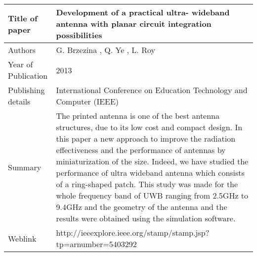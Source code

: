 \documentclass{article}
\begin{document}
\begin{table}
  \centering
	\begin{tabular}{ |l|p{11cm}| }
			\hline
		     Title of paper &  Development of a practical ultra- wideband antenna with planar circuit integration possibilities \\
		     \hline
			 Authors & G. Brzezina , Q. Ye , L. Roy \\
			\hline
			 Year of Publication & 2013 \\
			\hline
			 Publishing details & International Conference on Education Technology and Computer (IEEE) \\ \hline
			 Summary & The printed antenna is one of the best antenna structures, due to its low cost and compact design. In this paper a new approach to improve the radiation effectiveness and the performance of antennas by miniaturization of the size. Indeed, we have studied the performance of ultra wideband antenna which consists of a ring-shaped patch. This study was made for the whole frequency band of UWB ranging from 2.5GHz to 9.4GHz and the geometry of the antenna and the results were obtained using the simulation software. \\
			\hline
			 Weblink & http://ieeexplore.ieee.org/stamp/stamp.jsp?tp=arnumber=5403292 \\
			 \hline			 
	\end{tabular}		

\end{table}
\end{document}
